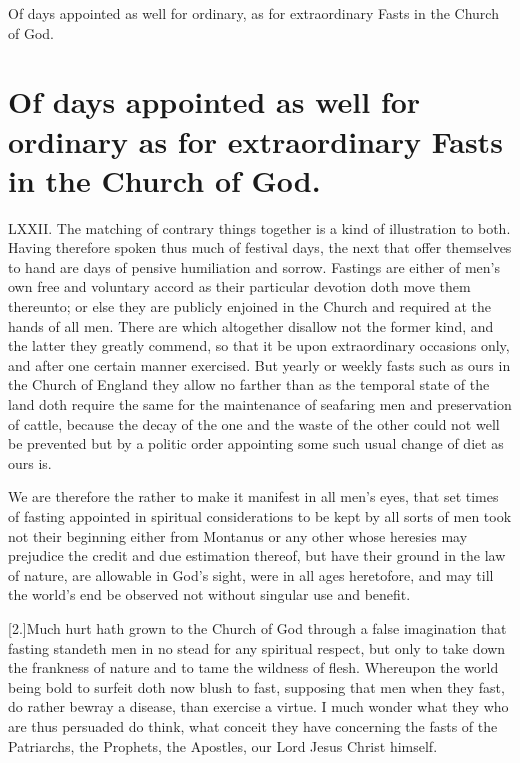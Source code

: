 Of days appointed as well for ordinary, as for extraordinary Fasts in the Church of God.
\section*{Of days appointed as well for ordinary as for extraordinary Fasts in the Church of God.}
LXXII. The matching of contrary things together is a kind of illustration to both. Having therefore spoken thus much of festival days, the next that offer themselves to hand are days of pensive humiliation and sorrow. Fastings are either of men’s own free and voluntary accord as their particular devotion doth move them thereunto; or else they are publicly enjoined in the Church and required at the hands of all men. There are which altogether disallow not the  former kind, and the latter they greatly commend, so that it be upon extraordinary occasions only,
 and after one certain manner exercised. But yearly or weekly fasts such as ours in the Church of England they allow no farther than as the temporal state of the land doth require the same for the maintenance of seafaring men and preservation of cattle, because the decay of the one and the waste of the other could not well be prevented but by a politic order appointing some such usual change of diet as ours is.

We are therefore the rather to make it manifest in all men’s eyes, that set times of fasting appointed in spiritual considerations to be kept by all sorts of men took not their beginning either from Montanus or any other whose heresies may prejudice the credit and due estimation thereof, but have their ground in the law of nature, are allowable in God’s sight, were in all ages heretofore, and may till the world’s end be observed not without singular use and benefit.

[2.]Much hurt hath grown to the Church of God through a false imagination that fasting standeth men in no stead for any spiritual respect, but only to take down the frankness of nature and to tame the wildness of flesh. Whereupon the world being bold to surfeit doth now blush to fast, supposing that men when they fast, do rather bewray a disease, than exercise a virtue. I much wonder what they who are thus persuaded do think, what conceit they have concerning the fasts of the Patriarchs, the Prophets, the Apostles, our Lord Jesus Christ himself.

